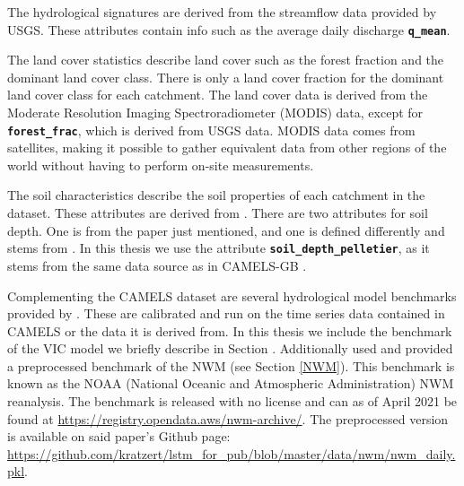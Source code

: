 The hydrological signatures are derived from the streamflow data provided by 
USGS. These attributes contain info such as the average daily discharge 
\textbf{\texttt{q\_mean}}.

The land cover statistics describe land cover such as the forest fraction and 
the dominant land cover class. There is only a land cover fraction for the dominant 
land cover class for each catchment. The land cover data is derived from the 
Moderate Resolution Imaging Spectroradiometer (MODIS) data, 
except for \textbf{\texttt{forest\_frac}}, which is derived from USGS data. MODIS 
data comes from satellites, making it possible to gather equivalent data from 
other regions of the world without having to perform on-site measurements.

The soil characteristics describe the soil properties of each catchment in the 
dataset. These attributes are derived from \citet{SoilData}. There are two 
attributes for soil depth. One is from the paper just mentioned, and one is defined 
differently and stems from \citet{pelletier}. In this thesis we use the attribute 
\textbf{\texttt{soil\_depth\_pelletier}}, as it stems from the same data source as 
in CAMELS-GB \citep{CAMELS_GB}.

Complementing the CAMELS dataset are several hydrological model benchmarks provided 
by \citet{CAMELS_hydroshare}. 
These are calibrated and run on the time series data contained in CAMELS or the data 
it is derived from. In this thesis we include the benchmark of the VIC model we 
briefly describe in Section \cite{VIC}. Additionally \citet{lstm_third_paper} used 
and provided a preprocessed  benchmark of the NWM (see Section \ref{NWM}). 
This benchmark is known as the 
NOAA (National Oceanic and Atmospheric Administration) NWM reanalysis. The benchmark 
is released with no license and can as of April 2021  be found at 
\url{https://registry.opendata.aws/nwm-archive/}.
The preprocessed version is available on said paper's 
Github page: \url{https://github.com/kratzert/lstm_for_pub/blob/master/data/nwm/nwm_daily.pkl}.


